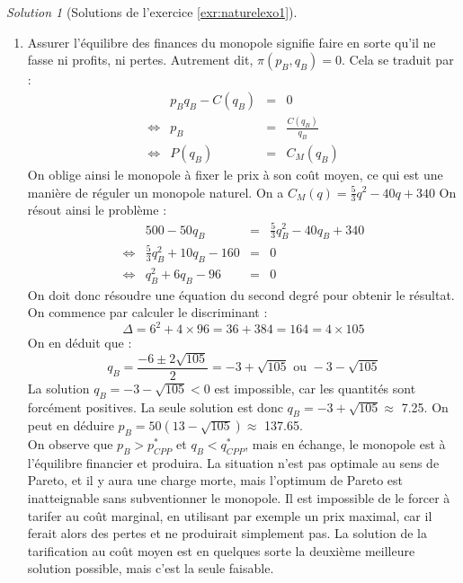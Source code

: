 \documentclass[
]{book}
\providecommand{\tightlist}{%
  \setlength{\itemsep}{0pt}\setlength{\parskip}{0pt}}
\theoremstyle{definition}
\theoremstyle{definition}
\theoremstyle{definition}
\theoremstyle{definition}
\theoremstyle{remark}
\newtheorem*{solution}{Solution}
\begin{document}
\begin{solution}[Solutions de l'exercice \ref{exr:naturelexo1}]
\begin{enumerate}
\def\labelenumi{\arabic{enumi}.}
\setcounter{enumi}{4}
\tightlist
\item
  Assurer l'équilibre des finances du monopole signifie faire en sorte qu'il ne fasse ni profits, ni pertes.
  Autrement dit, \(\pi(p_B, q_B)=0\).
  Cela se traduit par :
  \[
  \begin{array}{crcl}
  &p_Bq_B-C(q_B)&=&0 \\
  \Leftrightarrow & p_B&=&\frac{C(q_B)}{q_B}\\
  \Leftrightarrow & P(q_B)&=&C_M(q_B)
  \end{array}
  \]
  On oblige ainsi le monopole à fixer le prix à son coût moyen, ce qui est une manière de réguler un monopole naturel.
  On a \(C_M(q)=\frac{5}{3}q^2-40q+340\)
  On résout ainsi le problème :
  \[
  \begin{array}{crcl}
  &500-50q_B&=&\frac{5}{3}q_B^2-40q_B+340\\
  \Leftrightarrow & \frac{5}{3}q_B^2+10q_B-160&=&0\\
  \Leftrightarrow & q_B^2+6q_B-96&=&0
  \end{array}
  \]
  On doit donc résoudre une équation du second degré pour obtenir le résultat.
  On commence par calculer le discriminant :
  \[\Delta=6^2+4\times96=36+384=164=4\times105\]
  On en déduit que :
  \[q_B=\frac{-6\pm2\sqrt{105}}{2}=-3+\sqrt{105}\text{ ou } -3-\sqrt{105}\]
  La solution \(q_B=-3-\sqrt{105}<0\) est impossible, car les quantités sont forcément positives.
  La seule solution est donc \(q_{B}=-3+\sqrt{105}\approx\) 7.25.
  On peut en déduire \(p_{B}=50(13-\sqrt{105})\approx\) 137.65.\\
  On observe que \(p_B>p_{CPP}^*\) et \(q_B<q_{CPP}^*\), mais en échange, le monopole est à l'équilibre financier et produira.
  La situation n'est pas optimale au sens de Pareto, et il y aura une charge morte, mais l'optimum de Pareto est inatteignable sans subventionner le monopole.
  Il est impossible de le forcer à tarifer au coût marginal, en utilisant par exemple un prix maximal, car il ferait alors des pertes et ne produirait simplement pas.
  La solution de la tarification au coût moyen est en quelques sorte la deuxième meilleure solution possible, mais c'est la seule faisable.
\end{enumerate}

\end{solution}
\end{document}
